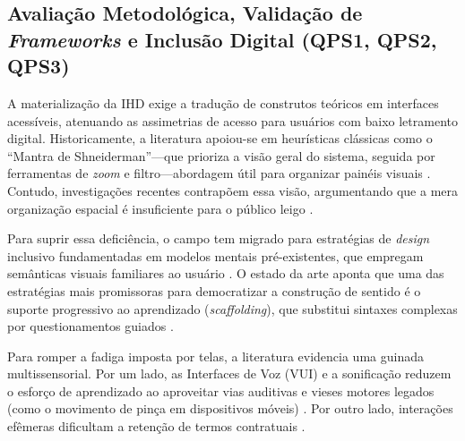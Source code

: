 \documentclass[12pt]{article}
\begin{document}

    \raggedbottom
    \subsection{Avaliação Metodológica, Validação de \textit{Frameworks} e Inclusão Digital (QPS1, QPS2, QPS3)}

    A materialização da IHD exige a tradução de construtos teóricos em interfaces acessíveis, atenuando as assimetrias de acesso para usuários com baixo letramento digital. Historicamente, a literatura apoiou-se em heurísticas clássicas como o ``Mantra de Shneiderman''---que prioriza a visão geral do sistema, seguida por ferramentas de \textit{zoom} e filtro---abordagem útil para organizar painéis visuais \cite{Victorelli2020Human}. Contudo, investigações recentes contrapõem essa visão, argumentando que a mera organização espacial é insuficiente para o público leigo \cite{Yuan20243615, Lindley2020}.

    Para suprir essa deficiência, o campo tem migrado para estratégias de \textit{design} inclusivo fundamentadas em modelos mentais pré-existentes, que empregam semânticas visuais familiares ao usuário \cite{Barreto2018, DeAlmeida2019}. O estado da arte aponta que uma das estratégias mais promissoras para democratizar a construção de sentido é o suporte progressivo ao aprendizado (\textit{scaffolding}), que substitui sintaxes complexas por questionamentos guiados \cite{Trajkova2020}.

    Para romper a fadiga imposta por telas, a literatura evidencia uma guinada multissensorial. Por um lado, as Interfaces de Voz (VUI) e a sonificação reduzem o esforço de aprendizado ao aproveitar vias auditivas e vieses motores legados (como o movimento de pinça em dispositivos móveis) \cite{Sailaja2021, Friedman2024}. Por outro lado, interações efêmeras dificultam a retenção de termos contratuais \cite{Jones2017, Lockwood2021}. 
\end{document}
